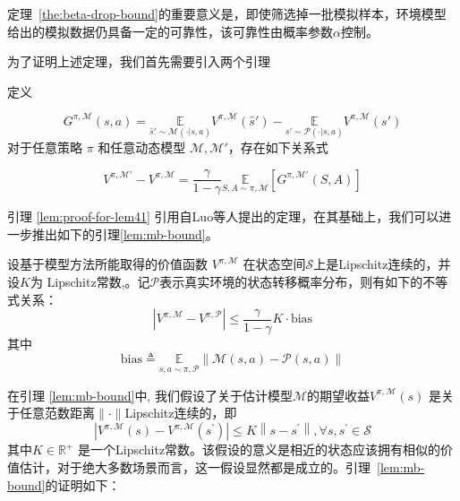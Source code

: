 定理~\ref{the:beta-drop-bound}的重要意义是，即使筛选掉一批模拟样本，环境模型给出的模拟数据仍具备一定的可靠性，该可靠性由概率参数$\alpha$控制。

为了证明上述定理，我们首先需要引入两个引理

\begin{lemma}\label{lem:proof-for-lem41}

定义

\begin{equation}\label{def:G-sa}
G^{\pi,\mathcal{M}}(s,a)=\underset{\hat{s}'\sim\mathcal{M}(\cdot|s,a)}{\mathbb{E}}{{V}^{\pi,\mathcal{M}}}(\hat{s}') - \underset{s'\sim\mathcal{P}(\cdot|s,a)}{\mathbb{E}}{{V}^{\pi,\mathcal{M}}}(s')
\end{equation}
对于任意策略 $\pi$ 和任意动态模型 $\mathcal{M},\mathcal{M}'$，存在如下关系式

\begin{equation}
{V}^{\pi,\mathcal{M}'} - {V}^{\pi,\mathcal{M}} = \frac{\gamma}{1-\gamma}\underset{S,A\sim\pi,\mathcal{M}}{\mathbb{E}}\left[G^{\pi,\mathcal{M}'}(S,A)\right]
\end{equation}

\end{lemma}

引理 \ref{lem:proof-for-lem41} 引用自Luo等人提出的定理，在其基础上，我们可以进一步推出如下的引理\ref{lem:mb-bound}。

\begin{lemma}\label{lem:mb-bound}
设基于模型方法所能取得的价值函数 ${V}^{\pi,\mathcal{M}}$ 在状态空间$\mathcal{S}$上是Lipschitz连续的，并设$K$为 Lipschitz常数,。记$\mathcal{P}$表示真实环境的状态转移概率分布，则有如下的不等式关系：
\begin{equation}
\left|{V}^{\pi, \mathcal{M}}-{V}^{\pi, \mathcal{P}}\right| \leq\frac{\gamma}{1-\gamma}K\cdot\mathrm{bias}
\end{equation}
其中
\begin{equation}
\mathrm{bias} \triangleq \underset{s,a\sim \pi,\mathcal{P}}{\mathbb{E}}\left\|\mathcal{M}(s, a)-\mathcal{P}(s, a)\right\|
\end{equation}

\label{theo:mb-bound}
\end{lemma}

在引理 \ref{lem:mb-bound}中, 我们假设了关于估计模型$\mathcal{M}$的期望收益${V}^{\pi,\mathcal{M}}(s)$ 是关于任意范数距离$\|\cdot\|$Lipschitz连续的，即
\begin{equation}\label{assum:lip}
    \left|{V}^{\pi,\mathcal{M}}(s)-{V}^{\pi,\mathcal{M}}(s^{\prime})\right| \leq K\left\|s-s^{\prime}\right\|, \forall s, s^{\prime} \in \mathcal{S}
\end{equation}
其中$K\in \mathbb{R}^+$ 是一个Lipschitz常数。该假设的意义是相近的状态应该拥有相似的价值估计，对于绝大多数场景而言，这一假设显然都是成立的。引理~\ref{lem:mb-bound}的证明如下：

